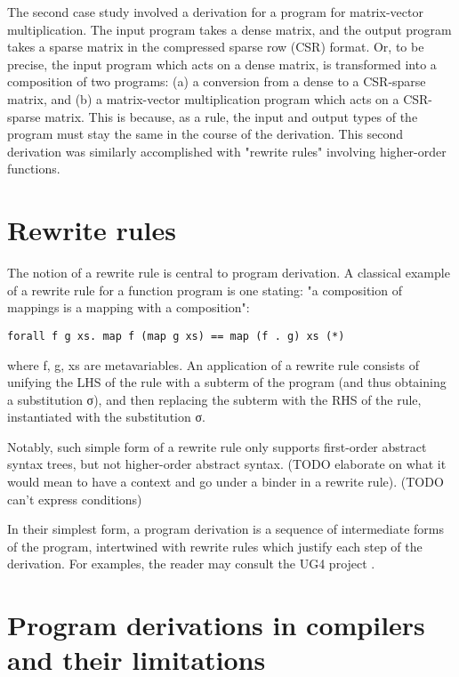 \documentclass[bsc,frontabs,twoside,singlespacing,parskip,deptreport]{infthesis}
\theoremstyle{definition}
\begin{document}
The second case study involved a derivation for a program for
matrix-vector multiplication. The input program takes a dense matrix,
and the output program takes a sparse matrix in the compressed sparse
row (CSR) format. Or, to be precise, the input program which acts on a
dense matrix, is transformed into a composition of two programs: (a) a
conversion from a dense to a CSR-sparse matrix, and (b) a
matrix-vector multiplication program which acts on a CSR-sparse
matrix. This is because, as a rule, the input and output types of the
program must stay the same in the course of the derivation. This
second derivation was similarly accomplished with "rewrite rules"
involving higher-order functions.

\section{Rewrite rules}
\label{sec:rewrite-rules}

The notion of a rewrite rule is central to program derivation. A
classical example of a rewrite rule for a function program is one
stating: "a composition of mappings is a mapping with a composition":

\begin{verbatim}
forall f g xs. map f (map g xs) == map (f . g) xs (*)
\end{verbatim}

where f, g, xs are metavariables. An application of a rewrite rule
consists of unifying the LHS of the rule with a subterm of the program
(and thus obtaining a substitution σ), and then replacing the
subterm with the RHS of the rule, instantiated with the substitution
σ.

Notably, such simple form of a rewrite rule only supports first-order
abstract syntax trees, but not higher-order abstract syntax. (TODO
elaborate on what it would mean to have a context and go under a
binder in a rewrite rule). (TODO can't express conditions)

In their simplest form, a program derivation is a sequence of
intermediate forms of the program, intertwined with rewrite rules
which justify each step of the derivation. For examples, the reader
may consult the UG4 project \cite{TODO}.

\section{Program derivations in compilers and their limitations}
\label{sec:progr-deriv-comp}
\end{document}
